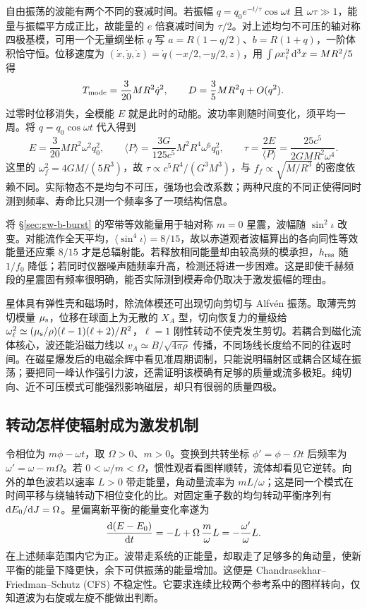 自由振荡的波能有两个不同的衰减时间。若振幅 $q=q_0e^{-t/\tau}\cos\omega t$ 且 $\omega\tau\gg1$，能量与振幅平方成正比，故能量的 $e$ 倍衰减时间为 $\tau/2$。对上述均匀不可压的轴对称四极基模，可用一个无量纲坐标 $q$ 写 $a=R(1-q/2)$、$b=R(1+q)$，一阶体积恰守恒。位移速度为 $(\dot x,\dot y,\dot z)=\dot q(-x/2,-y/2,z)$，用 $\int\rho x_i^2\,\dd^3x=MR^2/5$ 得
\[
 T_{\rm mode}=\frac{3}{20}MR^2\dot q^2,\qquad
 D=\frac35MR^2q+O(q^2).
\]
过零时位移消失，全模能 $E$ 就是此时的动能。波功率则随时间变化，须平均一周。将 $q=q_0\cos\omega t$ 代入得到
\[
 E=\frac{3}{20}MR^2\omega^2q_0^2,\qquad
 \langle P\rangle=\frac{3G}{125c^5}M^2R^4\omega^6q_0^2,\qquad
 \tau=\frac{2E}{\langle P\rangle}=\frac{25c^5}{2GMR^2\omega^4}.
\]
这里的 $\omega_f^2=4GM/(5R^3)$，故 $\tau\propto c^5R^4/(G^3M^3)$，与 $f_f\propto\sqrt{M/R^3}$ 的密度依赖不同。实际物态不是均匀不可压，强场也会改系数；两种尺度的不同正使得同时测到频率、寿命比只测一个频率多了一项结构信息。

将 \S\ref{sec:gw-b-burst} 的窄带等效能量用于轴对称 $m=0$ 星震，波幅随 $\sin^2\iota$ 改变。对能流作全天平均，$\langle\sin^4\iota\rangle=8/15$，故以赤道观者波幅算出的各向同性等效能量还应乘 $8/15$ 才是总辐射能。若释放相同能量却由较高频的模承担，$h_{\rm rss}$ 随 $1/f_0$ 降低；若同时仪器噪声随频率升高，检测还将进一步困难。这是即使千赫频段的星震固有频率很明确，能否实际测到模寿命仍取决于激发振幅的理由。

星体具有弹性壳和磁场时，除流体模还可出现切向剪切与 Alfvén 振荡。取薄壳剪切模量 $\mu_{\rm s}$，位移在球面上为无散的 $X_A$ 型，切向恢复力的量级给 $\omega_\ell^2\simeq(\mu_{\rm s}/\rho)(\ell-1)(\ell+2)/R^2$，$\ell=1$ 刚性转动不使壳发生剪切。若耦合到磁化流体核心，波还能沿磁力线以 $v_A\simeq B/\sqrt{4\pi\rho}$ 传播，不同场线长度给不同的往返时间。在磁星爆发后的电磁余辉中看见准周期调制，只能说明辐射区或耦合区域在振荡；要把同一峰认作强引力波，还需证明该模确有足够的质量或流多极矩。纯切向、近不可压模式可能强烈影响磁层，却只有很弱的质量四极。

\subsection{转动怎样使辐射成为激发机制}

令相位为 $m\phi-\omega t$，取 $\Omega>0$、$m>0$。变换到共转坐标 $\phi'=\phi-\Omega t$ 后频率为 $\omega'=\omega-m\Omega$。若 $0<\omega/m<\Omega$，惯性观者看图样顺转，流体却看见它逆转。向外的单色波若以速率 $L>0$ 带走能量，角动量流率为 $mL/\omega$；这是同一个模式在时间平移与绕轴转动下相位变化的比。对固定重子数的均匀转动平衡序列有 $\dd E_0/\dd J=\Omega$。星偏离新平衡的能量变化率遂为
\[
 \frac{\dd(E-E_0)}{\dd t}=-L+\Omega\,\frac{m}{\omega}L
                        =-\frac{\omega'}{\omega}L .
\]
在上述频率范围内它为正。波带走系统的正能量，却取走了足够多的角动量，使新平衡的能量下降更快，余下可供振荡的能量增加。这便是 Chandrasekhar--Friedman--Schutz (CFS) 不稳定性。它要求连续比较两个参考系中的图样转向，仅知道波为右旋或左旋不能做出判断。

